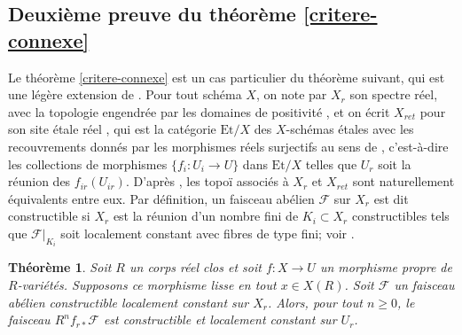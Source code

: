\documentclass[11pt]{article}
\newtheorem{thm}{Théorème}[section]
\theoremstyle{definition}
\newcommand{\mc}[1]{\mathcal{#1}}
\begin{document}
\subsection{Deuxième preuve du théorème \ref{critere-connexe}}
Le théorème \ref{critere-connexe} est un cas particulier du
théorème suivant, qui est une légère extension de \cite[Cor.\,17.20(a)]{scheiderer1994real}. Pour tout schéma $X$, on note par $X_r$ son spectre réel, avec la topologie engendrée par les domaines de positivité \cite[(0.4.1)--(0.4.2)]{scheiderer1994real}, et on écrit $X_{ret}$ pour son site étale réel \cite[Def.\,1.2.1]{scheiderer1994real}, qui est la catégorie $\mathrm{Et}/X$ des $X$-schémas étales avec les recouvrements donnés par les morphismes réels surjectifs au sens de \cite[Def.\,(1.1)]{scheiderer1994real}, c'est-à-dire les collections de morphismes $\{f_i\colon U_i\to U\}$ dans $\mathrm{Et}/X$ telles que $U_r$ soit la réunion des $f_{ir}(U_{ir})$. D'après \cite[Th.\,1.3]{scheiderer1994real}, les topoï associés à $X_r$ et $X_{ret}$ sont naturellement équivalents entre eux. Par définition, un faisceau abélien $\mc{F}$ sur $X_r$ est dit constructible si $X_r$ est la réunion d'un nombre fini de $K_i\subset X_r$ constructibles tels que $\mc{F}|_{K_i}$ soit localement constant avec fibres de type fini; voir \cite[Def.\,(A.3)]{scheiderer1994real}.

\begin{thm}\label{loc-const}
Soit $R$ un corps réel clos et soit $f\colon X\to U$ un morphisme propre de $R$-variétés. Supposons ce morphisme lisse en tout $x\in X(R)$. Soit $\mc{F}$ un faisceau abélien constructible localement constant sur $X_r$. Alors, pour tout $n\geq 0$, le faisceau $R^n f_{r*} \mc{F}$ est constructible et localement constant sur $U_r$.
\end{thm}
\end{document}
